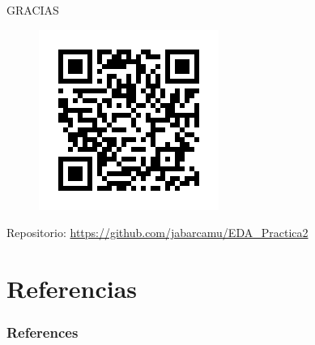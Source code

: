 \documentclass[11pt]{beamer}
\begin{document}
		
		\begin{frame}{}
		    \centering
		    
		    {
		        \Large
		        GRACIAS
		    }
		    
		    \begin{figure}[H]
				\centering
				\includegraphics[scale=0.5]{img/qr_repositorio.png}
				
				\label{fig:qr_repositorio}
			\end{figure}
			
			Repositorio: \url{https://github.com/jabarcamu/EDA_Practica2}
		    
		\end{frame}

\section{Referencias}



\begin{frame}[t, allowframebreaks]
    \frametitle{References}
    
    
\end{frame}
\end{document}
